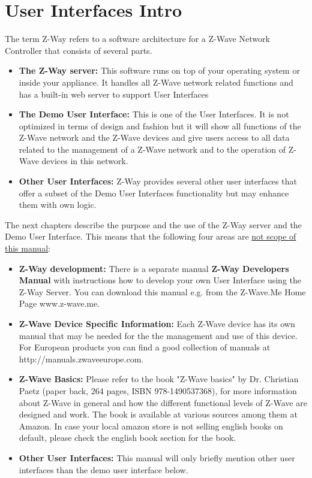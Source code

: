 \section {User Interfaces Intro}

The term Z-Way refers to a software architecture for a Z-Wave Network Controller that consists of several parts.

\begin{itemize}

\item {\bf The Z-Way server:} This software runs on top of your operating system or inside your appliance. It handles
all Z-Wave network related functions and has a built-in web server to support User Interfaces
\item {\bf The Demo User Interface:} This is one of the User Interfaces. It is not optimized in terms of design and fashion but
it will show all functions of the Z-Wave network and the Z-Wave devices and give users access to all data 
related to the management of a Z-Wave network and to the operation of Z-Wave devices in this network.
\item {\bf Other User Interfaces:} Z-Way provides several other user interfaces that offer a subset of the Demo User 
Interfaces functionality but may enhance them with own logic.
\end{itemize}

The next chapters describe the purpose and the use of the Z-Way server and the Demo User Interface. This means
that the following four areas are \underline{not scope of this manual}:

\begin{itemize}
\item {\bf Z-Way development:} There is a separate manual {\bf Z-Way Developers Manual} with instructions how to 
develop your own User Interface using the Z-Way Server. You can download this manual e.g. from the Z-Wave.Me 
Home Page www.z-wave.me.
\item {\bf Z-Wave Device Specific Information:} Each Z-Wave device has its own manual that may be needed for the 
the management and use of this device. For European products you can find a good collection of manuals
at http://manuals.zwaveeurope.com.
\item {\bf Z-Wave Basics:} Please refer to the book "Z-Wave basics" by Dr. Christian Paetz (paper back, 264 pages, 
ISBN 978-1490537368), for more information 
about Z-Wave in general and how the different functional levels of Z-Wave are designed and work. 
The book is available at various sources among them at Amazon. In case your local amazon store is not selling english 
books on default, please check the english book section for the book.

\item {\bf Other User Interfaces:} This manual will only briefly mention other user interfaces than the demo 
user interface below.
\end{itemize}

